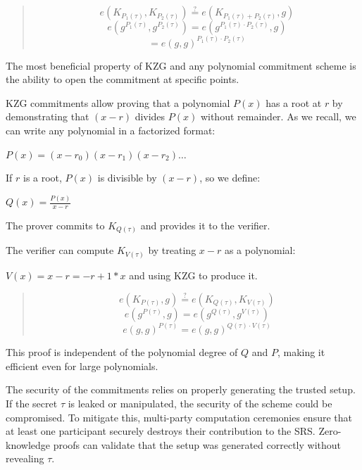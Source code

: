 \begin{quote}
   \begin{equation*}
 e(K_{P_1(\tau)}, K_{P_2(\tau)}) \stackrel{?}{=} e(K_{P_1(\tau) + P_2(\tau)}, g)
   \end{equation*}
   \begin{equation*}
 e(g^{P_1(\tau)}, g^{P_2(\tau)}) = e(g^{P_1(\tau) \cdot P_2(\tau)}, g)
   \end{equation*}
   \begin{equation*}
 = e(g, g)^{P_1(\tau) \cdot P_2(\tau)}
   \end{equation*}
\end{quote}
   


The most beneficial property of KZG and any polynomial commitment scheme is the ability to open the commitment at specific points.

KZG commitments allow proving that a polynomial \( P(x) \) has a root at \( r \) by demonstrating that \( (x - r) \) divides \( P(x) \) without remainder.
As we recall, we can write any polynomial in a factorized format:

$P(x) = (x - r_0)(x - r_1)(x - r_2) \dots$

If \( r \) is a root, \( P(x) \) is divisible by \( (x - r) \), so we define:

$Q(x) = \frac{P(x)}{x - r}$

The prover commits to \( K_{Q(\tau)} \) and provides it to the verifier.

The verifier can compute $K_{V(\tau)}$ by treating $x-r$ as a polynomial:

$V(x) = x - r = -r + 1 * x$
and using KZG to produce it.
\begin{quote}
   \begin{equation*}
 e(K_{P(\tau)}, g) \stackrel{?}{=} e(K_{Q(\tau)}, K_{V(\tau)})
   \end{equation*}
   \begin{equation*}
 e(g^{P(\tau)}, g) = e(g^{Q(\tau)}, g^{V(\tau)})
   \end{equation*}
   \begin{equation*}
 e(g, g)^{P(\tau)} = e(g, g)^{Q(\tau) \cdot V(\tau)}
   \end{equation*}
\end{quote}


This proof is independent of the polynomial degree of $Q$ and $P$, making it efficient even for large polynomials.


The security of the commitments relies on properly generating the trusted setup. 
If the secret $\tau$ is leaked or manipulated, the security of the scheme could be compromised. 
To mitigate this, multi-party computation ceremonies ensure that at least one participant securely destroys their contribution to the SRS. 
Zero-knowledge proofs can validate that the setup was generated correctly without revealing $\tau$.

